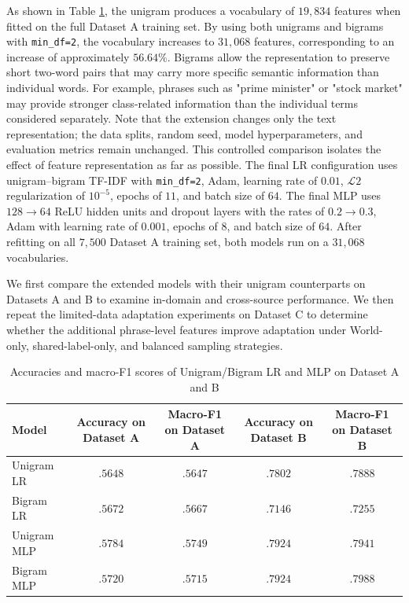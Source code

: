 \documentclass[letterpaper,conference,compsoc,onecolumn]{IEEEtran}
\begin{document}
As shown in Table \ref{table:feature_sizes_uni_bigrams}, the unigram produces a vocabulary of $19,834$ features when fitted on the full Dataset A training set. By using both unigrams and bigrams with \texttt{min\_df=2}, the vocabulary increases to $31,068$ features, corresponding to an increase of approximately $56.64\%$.
Bigrams allow the representation to preserve short two-word pairs that may carry more specific semantic information than individual words. For example, phrases such as "prime minister" or "stock market" may provide stronger class-related information than the individual terms considered separately.
Note that the extension changes only the text representation; the data splits, random seed, model hyperparameters, and evaluation metrics remain unchanged. This controlled comparison isolates the effect of feature representation as far as possible. The final LR configuration uses unigram--bigram TF-IDF with \texttt{min\_df=2}, Adam, learning rate of $0.01$, $\mathcal{L}2$ regularization of $10^{-5}$, epochs of $11$, and batch size of $64$. The final MLP uses $128 \to 64$ ReLU hidden units and dropout layers with the rates of $0.2 \to 0.3$, Adam with learning rate of $0.001$, epochs of $8$, and batch size of $64$. After refitting on all $7,500$ Dataset A training set, both models run on a $31,068$ vocabularies.

We first compare the extended models with their unigram counterparts on Datasets A and B to examine in-domain and cross-source performance. We then repeat the limited-data adaptation experiments on Dataset C to determine whether the additional phrase-level features improve adaptation under World-only, shared-label-only, and balanced sampling strategies.

\begin{table}[h]
  \centering
  \caption{Accuracies and macro-F1 scores of Unigram/Bigram LR and MLP on Dataset A and B}
  \label{table:feature_sizes_uni_bigrams}
  \begin{tabular}{lcccc}
    \hline
    \textbf{Model} & \textbf{Accuracy on Dataset A} & \textbf{Macro-F1 on Dataset A} & \textbf{Accuracy on Dataset B} & \textbf{Macro-F1 on Dataset B} \\
    \hline
    Unigram LR & $.5648$ & $.5647$ & $.7802$ & $.7888$\\
    Bigram LR & $.5672$ & $.5667$ & $.7146$ & $.7255$\\
    Unigram MLP & $.5784$ & $.5749$ & $.7924$ & $.7941$\\
    Bigram MLP & $.5720$ & $.5715$ & $.7924$ & $.7988$\\
    \hline  
  \end{tabular}
\end{table}
\end{document}
